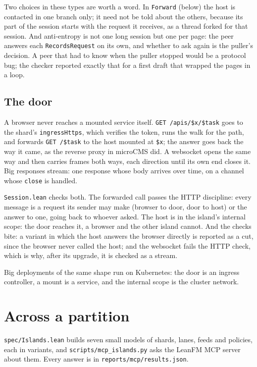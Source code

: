 \documentclass[11pt,oneside]{book}
\begin{document}
Two choices in these types are worth a word. In \texttt{Forward} (below) the
host is contacted in one branch only; it need not be told about the others,
because its part of the session starts with the request it receives, as a thread
forked for that session. And anti-entropy is not one long session but one per page: the peer
answers each \texttt{RecordsRequest} on its own, and whether to ask again is the
puller's decision. A peer that had to know when the puller stopped would be a
protocol bug; the checker reported exactly that for a first draft that wrapped
the pages in a loop.

\section{The door}
A browser never reaches a mounted service itself. \texttt{GET /apis/\$x/\$task}
goes to the shard's \texttt{ingressHttps}, which verifies the token, runs the walk
for the path, and forwards \texttt{GET /\$task} to the host mounted at
\texttt{\$x}; the answer goes back the way it came, as the reverse proxy in
microCMS did. A websocket opens the same way and then carries frames both ways,
each direction until its own end closes it. Big responses stream: one response
whose body arrives over time, on a channel whose \texttt{close} is handled.



\texttt{Session.lean} checks both. The forwarded call passes the HTTP discipline:
every message is a request its sender may make (browser to door, door to host) or
the answer to one, going back to whoever asked. The host is in the island's
internal scope: the door reaches it, a browser and the other island cannot. And
the checks bite: a variant in which the host answers the browser directly is
reported as a cut, since the browser never called the host; and the websocket
fails the HTTP check, which is why, after its upgrade, it is checked as a stream.

Big deployments of the same shape run on Kubernetes: the door is an ingress
controller, a mount is a service, and the internal scope is the cluster network.

\chapter{Across a partition}
\texttt{spec/Islands.lean} builds seven small models of shards, lanes, feeds and
policies, each in variants, and \texttt{scripts/mcp\_islands.py} asks the LeanFM MCP
server about them. Every answer is in \texttt{reports/mcp/results.json}.
\end{document}
